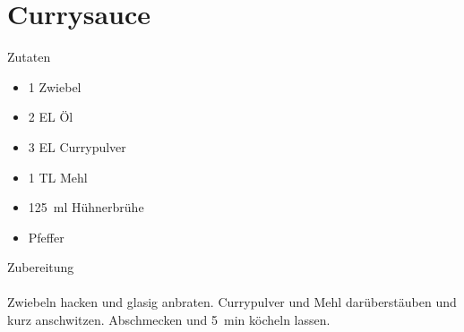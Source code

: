 \section*{Currysauce}
\ihead{}\ohead{}
\cfoot{}
{\Large Zutaten}
\begin{multicols}{2}
\begin{itemize}
    \item \num{1} Zwiebel
    \item \num{2} EL Öl
    \item \num{3} EL Currypulver
    \item \num{1} TL Mehl
    \item \SI{125}{ml} Hühnerbrühe
    \item Pfeffer
\end{itemize}
\end{multicols}
\noindent
{\Large Zubereitung}\\
\\
Zwiebeln hacken und glasig anbraten. 
Currypulver und Mehl darüberstäuben und kurz anschwitzen. Abschmecken und \SI{5}{min} köcheln lassen.